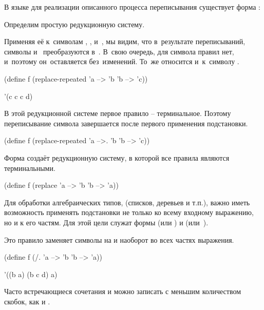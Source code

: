 В языке \FLP для реализации описанного процесса переписывания существует форма :

\begin{example}{Определим простую редукционную систему.

Применяя её к~символам , ,  и~, мы видим, что в~результате переписываний, символы  и~ преобразуются в~. В~свою очередь, для символа  правил нет, и~поэтому он~оставляется без~изменений. То~же относится и~к~символу .
}
  \begin{ExampleCode}
(define f
  (replace-repeated
    'a --> 'b
    'b --> 'c))
  \end{ExampleCode}
       {'(c c c d)}
\end{example}
\begin{example}{В этой редукционной системе первое правило -- терминальное.
Поэтому переписывание символа  завершается после первого применения подстановки.}
  \begin{ExampleCode}
(define f
  (replace-repeated
    'a -->. 'b
    'b --> 'c))
  \end{ExampleCode}
\end{example}

\begin{example}{Форма  создаёт редукционную систему, в которой все правила являются терминальными.}
  \begin{ExampleCode}
(define f
  (replace
    'a --> 'b
    'b --> 'a))
  \end{ExampleCode}
\end{example}


Для обработки алгебраических типов, (списков, деревьев и т.п.), важно иметь возможность применять подстановки не только ко всему входному выражению, но и к его частям. Для этой цели служат формы  (или ) и  (или~).

\begin{example}{Это правило заменяет символы  на  и наоборот во всех частях выражения.}
  \begin{ExampleCode}
(define f
  (/. 'a --> 'b
      'b --> 'a))
  \end{ExampleCode}
       {'((b a) (b c d) a)}
\end{example}

Часто встречающиеся сочетания  и  можно записать с меньшим количеством скобок, как  и .

